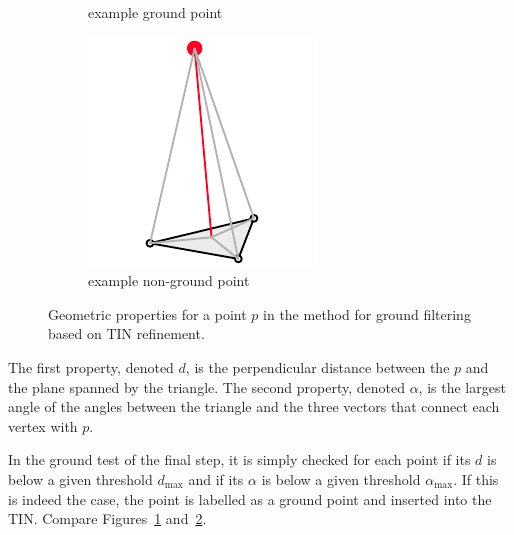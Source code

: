 \begin{figure}
\begin{subfigure}[b]{0.3\linewidth}
    \caption{example ground point}\label{fig:ground-filtering:ground}
  \end{subfigure}
  \begin{subfigure}[b]{0.3\linewidth}
    \centering
    \includegraphics[width=\textwidth]{figs/groundfilter-nonground.pdf}
    \caption{example non-ground point}\label{fig:ground-filtering:nonground}
  \end{subfigure}
  \caption{Geometric properties for a point $p$ in the method for ground filtering based on TIN refinement.}%
\label{fig:ground-filtering}
\end{figure}
The first property, denoted $d$, is the perpendicular distance between the $p$ and the plane spanned by the triangle.
The second property, denoted $\alpha$, is the largest angle of the angles between the triangle and the three vectors that connect each vertex with $p$. 

In the ground test of the final step, it is simply checked for each point if its $d$ is below a given threshold $d_{\max}$ and if its $\alpha$ is below a given threshold $\alpha_{\max}$.
If this is indeed the case, the point is labelled as a ground point and inserted into the TIN\@.
Compare Figures~\ref{fig:ground-filtering:ground} and~\ref{fig:ground-filtering:nonground}.

